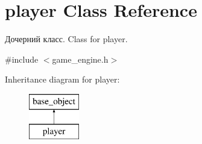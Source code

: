 \hypertarget{classplayer}{}\section{player Class Reference}
\label{classplayer}


Дочерний класс. Class for player.  




{\ttfamily \#include $<$game\+\_\+engine.\+h$>$}

Inheritance diagram for player\+:\begin{figure}[H]
\begin{center}
\leavevmode
\includegraphics[height=2.000000cm]{classplayer}
\end{center}
\end{figure}

